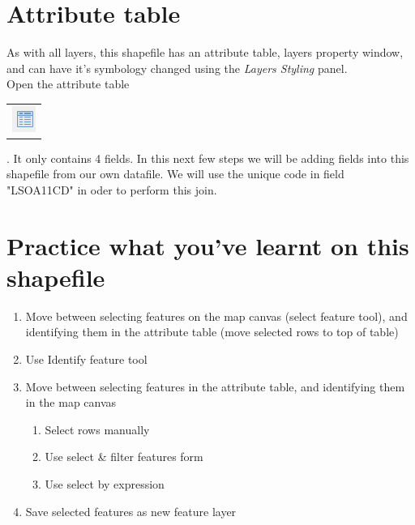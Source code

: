 \null\newpage

\section{Attribute table}

As with all layers, this shapefile has an attribute table, layers property window, and can have it's symbology changed using the \textit{Layers Styling} panel.\\

Open the attribute table
\begin{tabular}{@{}c@{}}\includegraphics[width=4ex]{images/attribute_table_icon.png}\end{tabular}. It only contains 4 fields. In this next few steps we will be adding fields into this shapefile from our own datafile. We will use the unique code in field "LSOA11CD" in oder to perform this join.

\section{Practice what you've learnt on this shapefile}

\begin{enumerate}
	\item 
	Move between selecting features on the map canvas (select feature tool), and identifying them in the attribute table (move selected rows to top of table)
	\item 
	Use Identify feature tool
	\item 
	Move between selecting features in the attribute table, and identifying them in the map canvas
	\begin{enumerate}
		\item 
		Select rows manually
		\item 
		Use select \& filter features form
		\item 
		Use select by expression
	\end{enumerate}
	\item 
	Save selected features as new feature layer
\end{enumerate}


